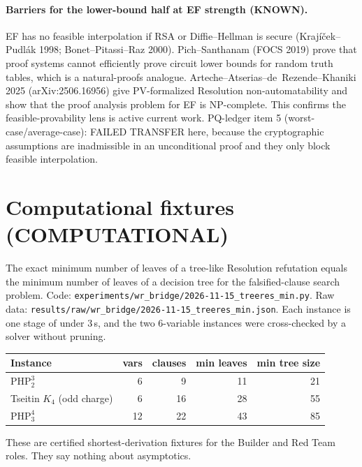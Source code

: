 \documentclass[11pt]{article}
\begin{document}
\paragraph{Barriers for the lower-bound half at EF strength (KNOWN).}
EF has no feasible interpolation if RSA or Diffie--Hellman is secure (Kraj\'i\v{c}ek--Pudl\'ak 1998; Bonet--Pitassi--Raz 2000).
Pich--Santhanam (FOCS 2019) prove that proof systems cannot efficiently prove circuit lower bounds for random truth tables, which is a natural-proofs analogue.
Arteche--Atserias--de~Rezende--Khaniki 2025 (arXiv:2506.16956) give PV-formalized Resolution non-automatability and show that the proof analysis problem for EF is NP-complete.
This confirms the feasible-provability lens is active current work.
PQ-ledger item 5 (worst-case/average-case): FAILED TRANSFER here, because the cryptographic assumptions are inadmissible in an unconditional proof and they only block feasible interpolation.

\section{Computational fixtures (COMPUTATIONAL)}
The exact minimum number of leaves of a tree-like Resolution refutation equals the minimum number of leaves of a decision tree for the falsified-clause search problem.
Code: \texttt{experiments/wr\_bridge/2026-11-15\_treeres\_min.py}. Raw data: \texttt{results/raw/wr\_bridge/2026-11-15\_treeres\_min.json}.
Each instance is one stage of under 3\,s, and the two 6-variable instances were cross-checked by a solver without pruning.
\begin{center}
\begin{tabular}{lrrrr}
Instance & vars & clauses & min leaves & min tree size\\\hline
$\mathrm{PHP}^3_2$ & 6 & 9 & 11 & 21\\
Tseitin $K_4$ (odd charge) & 6 & 16 & 28 & 55\\
$\mathrm{PHP}^4_3$ & 12 & 22 & 43 & 85
\end{tabular}
\end{center}
These are certified shortest-derivation fixtures for the Builder and Red Team roles. They say nothing about asymptotics.
\end{document}
